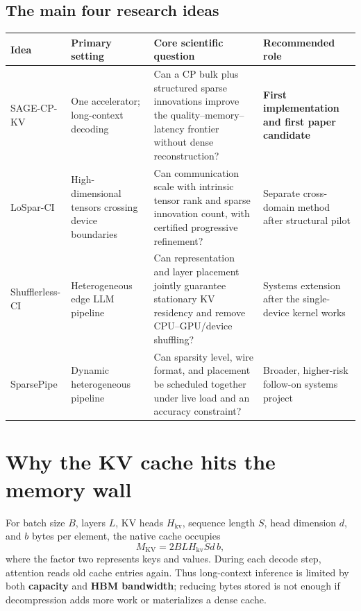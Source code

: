 \documentclass[10pt]{article}
\newcommand{\term}[1]{\textbf{\color{accent!85!black}#1}}
\begin{document}
\subsection{The main four research ideas}

\begin{center}
\small
\renewcommand{\arraystretch}{1.18}
\begin{tabularx}{.98\textwidth}{@{}P{2.4cm}P{3.1cm}Y P{3.2cm}@{}}
\toprule
\textbf{Idea} & \textbf{Primary setting} & \textbf{Core scientific question} &
\textbf{Recommended role} \\
\midrule
SAGE-CP-KV & One accelerator; long-context decoding & Can a CP bulk plus structured sparse
innovations improve the quality--memory--latency frontier without dense reconstruction? &
\textbf{First implementation and first paper candidate} \\
LoSpar-CI & High-dimensional tensors crossing device boundaries & Can communication scale with
intrinsic tensor rank and sparse innovation count, with certified progressive refinement? &
Separate cross-domain method after structural pilot \\
Shufflerless-CI & Heterogeneous edge LLM pipeline & Can representation and layer placement jointly
guarantee stationary KV residency and remove CPU--GPU/device shuffling? &
Systems extension after the single-device kernel works \\
SparsePipe & Dynamic heterogeneous pipeline & Can sparsity level, wire format, and placement be
scheduled together under live load and an accuracy constraint? &
Broader, higher-risk follow-on systems project \\
\bottomrule
\end{tabularx}
\end{center}

\section{Why the KV cache hits the memory wall}

For batch size $B$, layers $L$, KV heads $H_{\mathrm{kv}}$, sequence length $S$, head dimension
$d$, and $b$ bytes per element, the native cache occupies
\[
 M_{\mathrm{KV}}=2BLH_{\mathrm{kv}}Sd\,b ,
\]
where the factor two represents keys and values. During each decode step, attention reads old
cache entries again. Thus long-context inference is limited by both \term{capacity} and
\term{HBM bandwidth}; reducing bytes stored is not enough if decompression adds more work or
materializes a dense cache.
\end{document}
